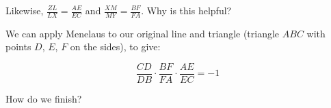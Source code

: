 



Likewise, $\frac{ZL}{LX} = \frac{AE}{EC}$ and $\frac{XM}{MY} = \frac{BF}{FA}$. Why is this helpful?









We can apply Menelaus to our original line and triangle (triangle $ABC$ with points $D$, $E$, $F$ on the sides), to give:

$$\frac{CD}{DB}\cdot\frac{BF}{FA}\cdot\frac{AE}{EC} = -1$$

How do we finish?



